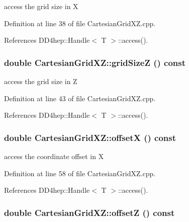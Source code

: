 access the grid size in X 

Definition at line 38 of file CartesianGridXZ.cpp.

References DD4hep::Handle$<$ T $>$::access().\hypertarget{class_d_d4hep_1_1_geometry_1_1_cartesian_grid_x_z_a658ed30a1835aa1e6fa20ce8d209e491}{
\subsubsection[{gridSizeZ}]{\setlength{\rightskip}{0pt plus 5cm}double CartesianGridXZ::gridSizeZ () const}}
\label{class_d_d4hep_1_1_geometry_1_1_cartesian_grid_x_z_a658ed30a1835aa1e6fa20ce8d209e491}


access the grid size in Z 

Definition at line 43 of file CartesianGridXZ.cpp.

References DD4hep::Handle$<$ T $>$::access().\hypertarget{class_d_d4hep_1_1_geometry_1_1_cartesian_grid_x_z_a37ed2e0a3619c4d8f6f87c6a1cf3bd37}{
\subsubsection[{offsetX}]{\setlength{\rightskip}{0pt plus 5cm}double CartesianGridXZ::offsetX () const}}
\label{class_d_d4hep_1_1_geometry_1_1_cartesian_grid_x_z_a37ed2e0a3619c4d8f6f87c6a1cf3bd37}


access the coordinate offset in X 

Definition at line 58 of file CartesianGridXZ.cpp.

References DD4hep::Handle$<$ T $>$::access().\hypertarget{class_d_d4hep_1_1_geometry_1_1_cartesian_grid_x_z_abcfda669a424829bd828df6a2448d7a2}{
\subsubsection[{offsetZ}]{\setlength{\rightskip}{0pt plus 5cm}double CartesianGridXZ::offsetZ () const}}
\label{class_d_d4hep_1_1_geometry_1_1_cartesian_grid_x_z_abcfda669a424829bd828df6a2448d7a2}



